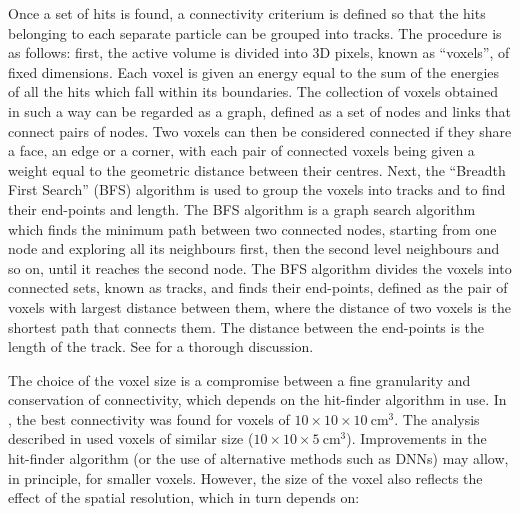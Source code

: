 \documentclass[a4paper,11pt]{article}
\begin{document}
Once a set of hits is found, a connectivity criterium is  defined so that the hits belonging to each separate particle can be grouped into tracks. The procedure is as follows: first, the active volume is divided into 3D pixels, known as ``voxels'', of fixed dimensions. Each voxel is given an energy equal to the sum of the energies of all the hits which fall within its boundaries. The collection of voxels obtained in such a way can be regarded as a graph, defined as a set of nodes and links that connect pairs of nodes. Two voxels can then be considered connected if they share a face, an edge or a corner, with each pair of connected voxels being given a weight equal to the geometric distance between their centres. Next, the ``Breadth First Search'' (BFS) algorithm  is used to group the voxels into tracks and to find their end-points and length. The BFS algorithm is a graph search algorithm which finds the minimum path between two connected nodes, starting from one node and exploring all its neighbours first, then the second level neighbours and so on, until it reaches the second node. The BFS algorithm divides the voxels into connected sets, known as tracks, and finds their end-points, defined as the pair of voxels with largest distance between them, where the distance of two voxels is the shortest path that connects them. The distance between the end-points is the length of the track. See \cite{NEXT_topology} for a thorough discussion.

The choice of the voxel size is a compromise between a fine granularity and conservation of connectivity, which depends on the hit-finder algorithm in use. In \cite{NEXT_topology},  the best connectivity  was  found for voxels of 
$10 \times 10 \times 10 \mathrm{~cm^3}$. The analysis described in \cite{Martin-Albo:2015rhw} used voxels
of similar size ($10 \times 10 \times 5 \mathrm{~cm^3}$).  Improvements in the hit-finder algorithm (or the use of alternative methods such as DNNs) may allow, in principle, for smaller voxels. However, the size of the voxel also reflects the effect of the spatial resolution, which in turn depends on: 
\end{document}
